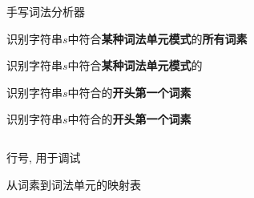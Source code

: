 
\begin{frame}{}

  \begin{center}
    手写词法分析器
  \end{center}
\end{frame}

\begin{frame}{}
  \begin{center}
    识别字符串$s$中符合{\bf 某种词法单元模式}的{\bf 所有词素}
    \ws \quad \ifkw \quad \elsekw \quad \id \quad \intnum \quad \floatnum \quad \relop \quad \assign

    \pause
    \vspace{0.80cm}
    识别字符串$s$中符合{\bf 某种词法单元模式}的

    \pause
    \vspace{0.80cm}
    识别字符串$s$中符合的{\bf 开头第一个词素}
  \end{center}
\end{frame}

\begin{frame}{}
  \begin{center}
    识别字符串$s$中符合的{\bf 开头第一个词素}

    \vspace{0.20cm}

    \vspace{0.30cm}
    \begin{columns}
        \begin{description}
          \setlength{\itemsep}{8pt}
          \item[line:] 行号, 用于调试
          \item[peek:] 
          \item[words:] 从词素到词法单元的映射表
        \end{description}
    \end{columns}
  \end{center}
\end{frame}

